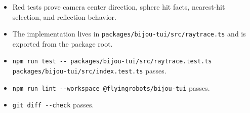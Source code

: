 \begin{itemize}
\tightlist
\item
  Red tests prove camera center direction, sphere hit facts, nearest-hit selection, and reflection behavior.
\item
  The implementation lives in \texttt{p\allowbreak{}a\allowbreak{}c\allowbreak{}k\allowbreak{}a\allowbreak{}g\allowbreak{}e\allowbreak{}s\allowbreak{}/\allowbreak{}b\allowbreak{}i\allowbreak{}j\allowbreak{}o\allowbreak{}u\allowbreak{}-\allowbreak{}t\allowbreak{}u\allowbreak{}i\allowbreak{}/\allowbreak{}s\allowbreak{}r\allowbreak{}c\allowbreak{}/\allowbreak{}r\allowbreak{}a\allowbreak{}y\allowbreak{}t\allowbreak{}r\allowbreak{}a\allowbreak{}c\allowbreak{}e\allowbreak{}.\allowbreak{}t\allowbreak{}s} and is exported from the package root.
\item
  \texttt{n\allowbreak{}p\allowbreak{}m\allowbreak{} \allowbreak{}r\allowbreak{}u\allowbreak{}n\allowbreak{} \allowbreak{}t\allowbreak{}e\allowbreak{}s\allowbreak{}t\allowbreak{} \allowbreak{}-\allowbreak{}-\allowbreak{} \allowbreak{}p\allowbreak{}a\allowbreak{}c\allowbreak{}k\allowbreak{}a\allowbreak{}g\allowbreak{}e\allowbreak{}s\allowbreak{}/\allowbreak{}b\allowbreak{}i\allowbreak{}j\allowbreak{}o\allowbreak{}u\allowbreak{}-\allowbreak{}t\allowbreak{}u\allowbreak{}i\allowbreak{}/\allowbreak{}s\allowbreak{}r\allowbreak{}c\allowbreak{}/\allowbreak{}r\allowbreak{}a\allowbreak{}y\allowbreak{}t\allowbreak{}r\allowbreak{}a\allowbreak{}c\allowbreak{}e\allowbreak{}.\allowbreak{}t\allowbreak{}e\allowbreak{}s\allowbreak{}t\allowbreak{}.\allowbreak{}t\allowbreak{}s\allowbreak{} \allowbreak{}p\allowbreak{}a\allowbreak{}c\allowbreak{}k\allowbreak{}a\allowbreak{}g\allowbreak{}e\allowbreak{}s\allowbreak{}/\allowbreak{}b\allowbreak{}i\allowbreak{}j\allowbreak{}o\allowbreak{}u\allowbreak{}-\allowbreak{}t\allowbreak{}u\allowbreak{}i\allowbreak{}/\allowbreak{}s\allowbreak{}r\allowbreak{}c\allowbreak{}/\allowbreak{}i\allowbreak{}n\allowbreak{}d\allowbreak{}e\allowbreak{}x\allowbreak{}.\allowbreak{}t\allowbreak{}e\allowbreak{}s\allowbreak{}t\allowbreak{}.\allowbreak{}t\allowbreak{}s} passes.
\item
  \texttt{n\allowbreak{}p\allowbreak{}m\allowbreak{} \allowbreak{}r\allowbreak{}u\allowbreak{}n\allowbreak{} \allowbreak{}l\allowbreak{}i\allowbreak{}n\allowbreak{}t\allowbreak{} \allowbreak{}-\allowbreak{}-\allowbreak{}w\allowbreak{}o\allowbreak{}r\allowbreak{}k\allowbreak{}s\allowbreak{}p\allowbreak{}a\allowbreak{}c\allowbreak{}e\allowbreak{} \allowbreak{}@\allowbreak{}f\allowbreak{}l\allowbreak{}y\allowbreak{}i\allowbreak{}n\allowbreak{}g\allowbreak{}r\allowbreak{}o\allowbreak{}b\allowbreak{}o\allowbreak{}t\allowbreak{}s\allowbreak{}/\allowbreak{}b\allowbreak{}i\allowbreak{}j\allowbreak{}o\allowbreak{}u\allowbreak{}-\allowbreak{}t\allowbreak{}u\allowbreak{}i} passes.
\item
  \texttt{g\allowbreak{}i\allowbreak{}t\allowbreak{} \allowbreak{}d\allowbreak{}i\allowbreak{}f\allowbreak{}f\allowbreak{} \allowbreak{}-\allowbreak{}-\allowbreak{}c\allowbreak{}h\allowbreak{}e\allowbreak{}c\allowbreak{}k} passes.
\end{itemize}

